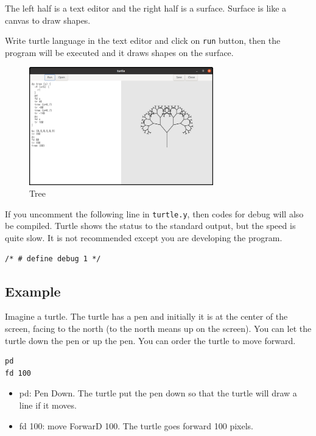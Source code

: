 The left half is a text editor and the right half is a surface. Surface
is like a canvas to draw shapes.

Write turtle language in the text editor and click on
\passthrough{\lstinline!run!} button, then the program will be executed
and it draws shapes on the surface.

\begin{figure}
\centering
\includegraphics[width=8cm,height=5.11cm]{../src/turtle/image/turtle_tree.png}
\caption{Tree}
\end{figure}

If you uncomment the following line in
\passthrough{\lstinline!turtle.y!}, then codes for debug will also be
compiled. Turtle shows the status to the standard output, but the speed
is quite slow. It is not recommended except you are developing the
program.

\begin{lstlisting}
/* # define debug 1 */
\end{lstlisting}

\subsection{Example}\label{example}

Imagine a turtle. The turtle has a pen and initially it is at the center
of the screen, facing to the north (to the north means up on the
screen). You can let the turtle down the pen or up the pen. You can
order the turtle to move forward.

\begin{lstlisting}
pd
fd 100
\end{lstlisting}

\begin{itemize}
\tightlist
\item
  pd: Pen Down. The turtle put the pen down so that the turtle will draw
  a line if it moves.
\item
  fd 100: move ForwarD 100. The turtle goes forward 100 pixels.
\end{itemize}

